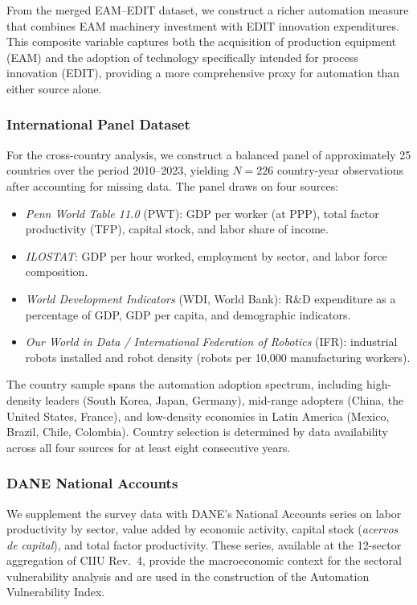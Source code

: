 \documentclass{article}
\begin{document}
From the merged EAM--EDIT dataset, we construct a richer automation measure that combines EAM machinery investment with EDIT innovation expenditures. This composite variable captures both the acquisition of production equipment (EAM) and the adoption of technology specifically intended for process innovation (EDIT), providing a more comprehensive proxy for automation than either source alone.

\subsubsection*{International Panel Dataset}

For the cross-country analysis, we construct a balanced panel of approximately 25 countries over the period 2010--2023, yielding $N = 226$ country-year observations after accounting for missing data. The panel draws on four sources:

\begin{itemize}[nosep]
\item \textit{Penn World Table 11.0} (PWT): GDP per worker (at PPP), total factor productivity (TFP), capital stock, and labor share of income.
\item \textit{ILOSTAT}: GDP per hour worked, employment by sector, and labor force composition.
\item \textit{World Development Indicators} (WDI, World Bank): R\&D expenditure as a percentage of GDP, GDP per capita, and demographic indicators.
\item \textit{Our World in Data / International Federation of Robotics} (IFR): industrial robots installed and robot density (robots per 10,000 manufacturing workers).
\end{itemize}

The country sample spans the automation adoption spectrum, including high-density leaders (South Korea, Japan, Germany), mid-range adopters (China, the United States, France), and low-density economies in Latin America (Mexico, Brazil, Chile, Colombia). Country selection is determined by data availability across all four sources for at least eight consecutive years.

\subsubsection*{DANE National Accounts}

We supplement the survey data with DANE's National Accounts series on labor productivity by sector, value added by economic activity, capital stock (\textit{acervos de capital}), and total factor productivity. These series, available at the 12-sector aggregation of CIIU Rev.\ 4, provide the macroeconomic context for the sectoral vulnerability analysis and are used in the construction of the Automation Vulnerability Index.
\end{document}
